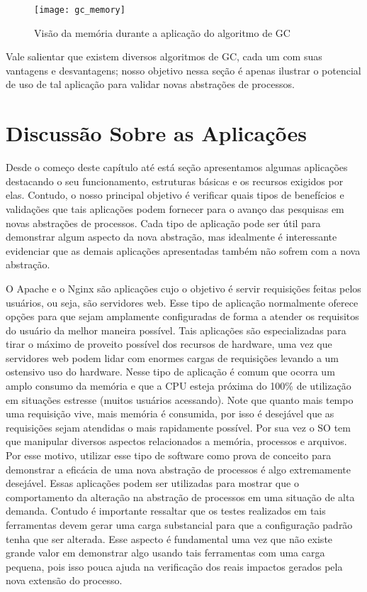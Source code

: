 \begin{figure}[!h]
  \centering
  \texttt{[image: gc\_memory]}
	\caption[Visão da memória durante a aplicação do algoritmo de GC]{Visão da memória durante a aplicação do algoritmo de GC\citep{gc_basics}}
  \label{fig:gc_mem}
\end{figure}

Vale salientar que existem diversos algoritmos de GC, cada um com suas
vantagens e desvantagens; nosso objetivo nessa seção é apenas ilustrar o
potencial de uso de tal aplicação para validar novas abstrações de processos.

\section{Discussão Sobre as Aplicações}
\label{sec:disc_app}

Desde o começo deste capítulo até está seção apresentamos algumas aplicações
destacando o seu funcionamento, estruturas básicas e os recursos exigidos por
elas. Contudo, o nosso principal objetivo é verificar quais tipos de benefícios
e validações que tais aplicações podem fornecer para o avanço das pesquisas em
novas abstrações de processos. Cada tipo de aplicação pode ser útil para
demonstrar algum aspecto da nova abstração, mas idealmente é interessante
evidenciar que as demais aplicações apresentadas também não sofrem com a nova
abstração.

O Apache e o Nginx são aplicações cujo o objetivo é servir requisições feitas
pelos usuários, ou seja, são servidores web. Esse tipo de aplicação normalmente
oferece opções para que sejam amplamente configuradas de forma a atender os
requisitos do usuário da melhor maneira possível. Tais aplicações são
especializadas para tirar o máximo de proveito possível dos recursos de hardware,
uma vez que servidores web podem lidar com enormes cargas de requisições
levando a um ostensivo uso do hardware. Nesse tipo de aplicação é comum que
ocorra um amplo consumo da memória e que a CPU esteja próxima do 100\% de
utilização em situações estresse (muitos usuários acessando).  Note que quanto
mais tempo uma requisição vive, mais memória é consumida, por isso é desejável
que as requisições sejam atendidas o mais rapidamente possível. Por sua vez o
SO tem que manipular diversos aspectos relacionados a memória, processos e
arquivos. Por esse motivo, utilizar esse tipo de software como prova de
conceito para demonstrar a eficácia de uma nova abstração de processos é algo
extremamente desejável. Essas aplicações podem ser utilizadas para mostrar que
o comportamento da alteração na abstração de processos em uma situação de alta
demanda. Contudo é importante ressaltar que os testes realizados em tais
ferramentas devem gerar uma carga substancial para que a configuração padrão
tenha que ser alterada. Esse aspecto é fundamental uma vez que não existe
grande valor em demonstrar algo usando tais ferramentas com uma carga pequena,
pois isso pouca ajuda na verificação dos reais impactos gerados pela nova
extensão do processo.

